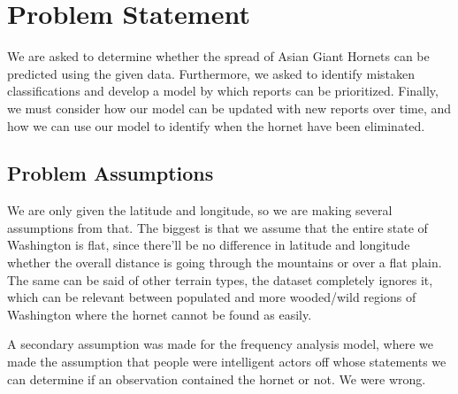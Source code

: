 \documentclass[letterpaper]{article}
\begin{document}
\section{Problem Statement}
We are asked to determine whether the spread of Asian Giant Hornets can be predicted using the given data. Furthermore, we asked to identify mistaken classifications and develop a model by which reports can be prioritized. Finally, we must consider how our model can be updated with new reports over time, and how we can use our model to identify when the hornet have been eliminated. 

\subsection{Problem Assumptions}

We are only given the latitude and longitude, so we are making several assumptions from that. The biggest is that we assume that the entire state of Washington is flat, since there'll be no difference in latitude and longitude whether the overall distance is going through the mountains or over a flat plain. The same can be said of other terrain types, the dataset completely ignores it, which can be relevant between populated and more wooded/wild regions of Washington where the hornet cannot be found as easily. 

A secondary assumption was made for the frequency analysis model, where we made the assumption that people were intelligent actors off whose statements we can determine if an observation contained the hornet or not. We were wrong.
\end{document}
